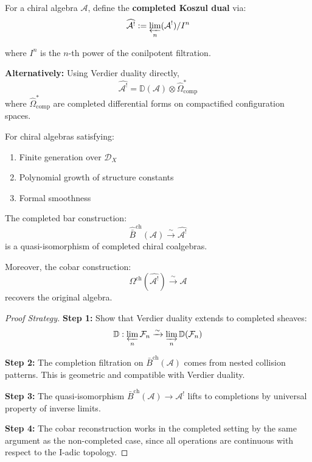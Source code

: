\begin{definition}\label{def:completed-dual}
For a chiral algebra $\mathcal{A}$, define the \textbf{completed Koszul dual} via:
$$\widehat{\mathcal{A}^!} := \varprojlim_n (\mathcal{A}^!)/I^n$$

where $I^n$ is the $n$-th power of the conilpotent filtration.

\textbf{Alternatively:} Using Verdier duality directly,
$$\widehat{\mathcal{A}^!} = \mathbb{D}(\mathcal{A}) \otimes \widehat{\Omega}^*_{\text{comp}}$$
where $\widehat{\Omega}^*_{\text{comp}}$ are completed differential forms on compactified configuration spaces.
\end{definition}

\begin{theorem}\label{thm:completion-koszul}
For chiral algebras satisfying:
\begin{enumerate}
\item Finite generation over $\mathcal{D}_X$
\item Polynomial growth of structure constants
\item Formal smoothness
\end{enumerate}

The completed bar construction:
$$\widehat{\bar{B}}^{\text{ch}}(\mathcal{A}) \xrightarrow{\sim} \widehat{\mathcal{A}^!}$$
is a quasi-isomorphism of completed chiral coalgebras.

Moreover, the cobar construction:
$$\Omega^{\text{ch}}(\widehat{\mathcal{A}^!}) \xrightarrow{\sim} \mathcal{A}$$
recovers the original algebra.
\end{theorem}

\begin{proof}[Proof Strategy]
\textbf{Step 1:} Show that Verdier duality extends to completed sheaves:
$$\mathbb{D}: \varprojlim_n \mathcal{F}_n \xrightarrow{\sim} \varinjlim_n \mathbb{D}(\mathcal{F}_n)$$

\textbf{Step 2:} The completion filtration on $\bar{B}^{\text{ch}}(\mathcal{A})$ comes from nested collision patterns. This is geometric and compatible with Verdier duality.

\textbf{Step 3:} The quasi-isomorphism $\bar{B}^{\text{ch}}(\mathcal{A}) \to \mathcal{A}^!$ lifts to completions by universal property of inverse limits.

\textbf{Step 4:} The cobar reconstruction works in the completed setting by the same argument as the non-completed case, since all operations are continuous with respect to the I-adic topology.
\end{proof}

